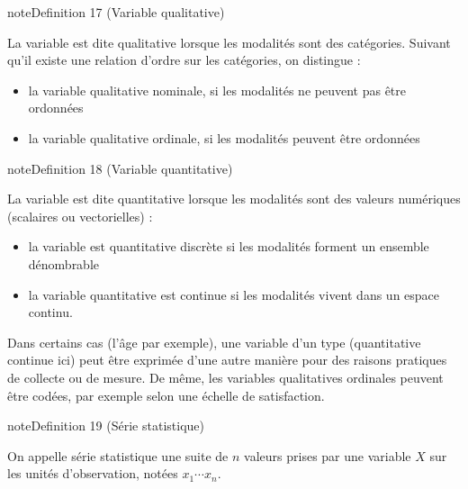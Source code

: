 \documentclass[letterpaper,10pt,english]{jupyterBook}
\begin{document}
\ignorespaces \label{statsdescriptives:definition-0}
\begin{sphinxadmonition}{note}{Definition 17 (Variable qualitative)}



\sphinxAtStartPar
La variable est dite qualitative lorsque les modalités sont des catégories. Suivant qu’il existe une relation d’ordre sur les catégories, on distingue :
\begin{itemize}
\item {} 
\sphinxAtStartPar
la variable qualitative nominale, si les modalités  ne peuvent pas être ordonnées

\item {} 
\sphinxAtStartPar
la variable qualitative ordinale, si les modalités peuvent être ordonnées

\end{itemize}
\end{sphinxadmonition}

\ignorespaces \label{statsdescriptives:definition-1}
\begin{sphinxadmonition}{note}{Definition 18 (Variable quantitative)}



\sphinxAtStartPar
La variable est dite quantitative lorsque les modalités sont des valeurs numériques (scalaires ou vectorielles) :
\begin{itemize}
\item {} 
\sphinxAtStartPar
la variable est quantitative discrète si les modalités forment un ensemble dénombrable

\item {} 
\sphinxAtStartPar
la variable quantitative est continue si les modalités vivent dans un espace continu.

\end{itemize}
\end{sphinxadmonition}

\sphinxAtStartPar
Dans certains cas (l’âge par exemple), une variable d’un type (quantitative continue ici) peut être exprimée d’une autre manière pour des raisons pratiques de collecte ou de mesure. De même, les variables qualitatives ordinales peuvent être codées, par exemple selon une échelle de satisfaction.

\ignorespaces \label{statsdescriptives:definition-2}
\begin{sphinxadmonition}{note}{Definition 19 (Série statistique)}



\sphinxAtStartPar
On appelle série statistique une suite de \(n\) valeurs prises par une variable \(X\) sur les unités d’observation, notées \(x_1\cdots x_n\).
\end{sphinxadmonition}
\end{document}
